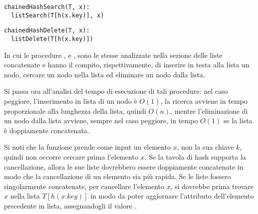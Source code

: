 \begin{lstlisting}
chainedHashSearch(T, x):
  listSearch(T[h(x.key)], x)
\end{lstlisting}

\begin{lstlisting}
chainedHashDelete(T, x):
  listDelete(T[h(x.key)])
\end{lstlisting}

In cui le procedure ,  e , sono le stesse analizzate nella sezione delle liste concatenate e hanno il compito, rispettivamente, di inserire in testa alla lista un nodo, cercare un nodo nella lista ed eliminare un nodo dalla lista. 

Si passa ora all'analisi del tempo di esecuzione di tali procedure: nel caso peggiore, l'inserimento in lista di un nodo è \(O(1)\), la ricerca avviene in tempo proporzionale alla lunghezza della lista, quindi \(O(n)\), mentre l'eliminazione di un nodo dalla lista avviene, sempre nel caso peggiore, in tempo \(O(1)\) se la lista è doppiamente concatenata. 

Si noti che la funzione  prende come input un elemento \(x\), non la sua chiave \(k\), quindi non occorre cercare prima l'elemento \(x\). Se la tavola di hash supporta la cancellazione, allora le sue liste dovrebbero essere doppiamente concatenate in modo che la cancellazione di un elemento sia più rapida. Se le liste fossero singolarmente concatenate, per cancellare l'elemento \(x\), si dovrebbe prima trovare \(x\) nella lista \(T[h(x.key)]\) in modo da poter aggiornare l'attributo  dell'elemento precedente in lista, assegnandogli il valore .

